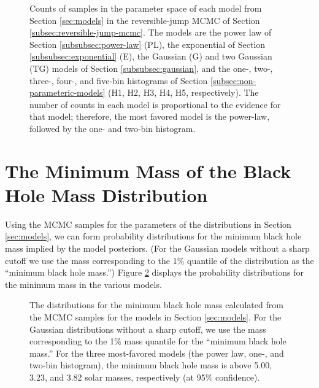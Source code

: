 \documentclass[preprint]{aastex}
\begin{document}
\begin{figure}
  \begin{center}
  \end{center}
  \caption{\label{fig:rj} Counts of samples in the parameter space of
    each model from Section \ref{sec:models} in the reversible-jump
    MCMC of Section \ref{subsec:reversible-jump-mcmc}.  The models
    are the power law of Section \ref{subsubsec:power-law} (PL),
    the exponential of Section \ref{subsubsec:exponential} (E),
    the Gaussian (G) and two Gaussian (TG) models of Section
    \ref{subsubsec:gaussian}, and the one-, two-, three-, four-, and
    five-bin histograms of Section
    \ref{subsec:non-parameteric-models} (H1, H2, H3, H4, H5,
    respectively).  The number of counts in each model is proportional
    to the evidence for that model; therefore, the most favored model
    is the power-law, followed by the one- and two-bin histogram.  }
\end{figure}

\section{The Minimum Mass of the Black Hole Mass Distribution}
\label{sec:minimum-mass}

Using the MCMC samples for the parameters of the distributions in
Section \ref{sec:models}, we can form probability distributions for
the minimum black hole mass implied by the model posteriors.  (For the
Gaussian models without a sharp cutoff we use the mass corresponding
to the 1\% quantile of the distribution as the ``minimum black hole
mass.'')  Figure \ref{fig:min-mass} displays the probability
distributions for the minimum mass in the various models.  

\begin{figure}
  \begin{center}
  \end{center}
  \caption{\label{fig:min-mass} The distributions for the minimum
    black hole mass calculated from the MCMC samples for the models in
    Section \ref{sec:models}.  For the Gaussian distributions without
    a sharp cutoff, we use the mass corresponding to the 1\% mass
    quantile for the ``minimum black hole mass.''  For the three
    most-favored models (the power law, one-, and two-bin histogram),
    the minimum black hole mass is above 5.00, 3.23, and 3.82 solar
    masses, respectively (at 95\% confidence). }
\end{figure}
\end{document}
